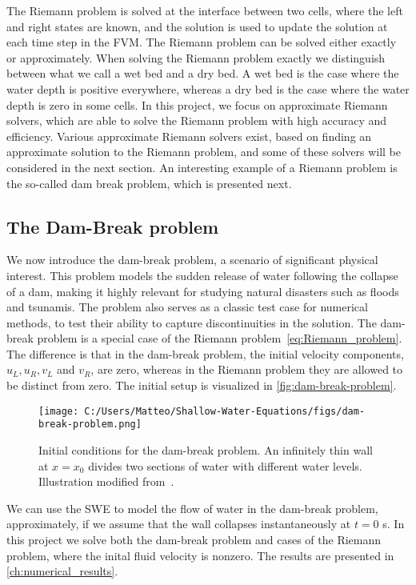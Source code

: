 The Riemann problem is solved at the interface between two cells, where the left and right states are known, and the solution is used to update the solution at each time step in the FVM.
The Riemann problem can be solved either exactly or approximately.
When solving the Riemann problem exactly we distinguish between what we call a wet bed and a dry bed.
A wet bed is the case where the water depth is positive everywhere, whereas a dry bed is the case where the water depth is zero in some cells.
In this project, we focus on approximate Riemann solvers, which are able to solve the Riemann problem with high accuracy and efficiency.
Various approximate Riemann solvers exist, based on finding an approximate solution to the Riemann problem, and some of these solvers will be considered in the next section.
An interesting example of a Riemann problem is the so-called dam break problem, which is presented next.

\subsection{The Dam-Break problem}
We now introduce the dam-break problem, a scenario of significant physical interest.
This problem models the sudden release of water following the collapse of a dam, making it highly relevant for studying natural disasters such as floods and tsunamis.
The problem also serves as a classic test case for numerical methods, to test their ability to capture discontinuities in the solution.
The dam-break problem is a special case of the Riemann problem~\eqref{eq:Riemann_problem}.
The difference is that in the dam-break problem, the initial velocity components, $u_L, u_R, v_L$ and $v_R$, are zero, whereas in the Riemann problem they are allowed to be distinct from zero.
The initial setup is visualized in \autoref{fig:dam-break-problem}.
\begin{figure}[H]
    \centering
    \texttt{[image: C:/Users/Matteo/Shallow-Water-Equations/figs/dam-break-problem.png]}
    \caption{Initial conditions for the dam-break problem. An infinitely thin wall at $x=x_0$ divides two sections of water with different water levels. Illustration modified from~\cite{Toro2024}.}\label{fig:dam-break-problem}
\end{figure} 
We can use the SWE to model the flow of water in the dam-break problem, approximately, if we assume that the wall collapses instantaneously at $t=0$ s.
In this project we solve both the dam-break problem and cases of the Riemann problem, where the inital fluid velocity is nonzero.
The results are presented in \autoref{ch:numerical_results}.

